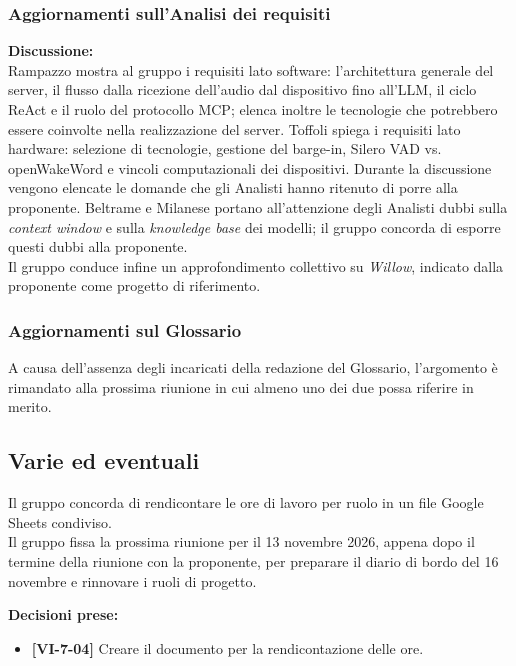 \documentclass[12pt,a4paper]{article}
\newcommand{\tightlist}{\setlength{\itemsep}{1pt}\setlength{\parskip}{0pt}}
\begin{document}
\subsubsection{Aggiornamenti sull'Analisi dei requisiti}
\textbf{Discussione:} \\
Rampazzo mostra al gruppo i requisiti lato software: l'architettura generale del server, il flusso dalla ricezione dell'audio dal dispositivo fino all'LLM, il ciclo ReAct e il ruolo del protocollo MCP; elenca inoltre le tecnologie che potrebbero essere coinvolte nella realizzazione del server.
Toffoli spiega i requisiti lato hardware: selezione di tecnologie, gestione del barge-in, Silero VAD vs. openWakeWord e vincoli computazionali dei dispositivi. Durante la discussione vengono elencate le domande che gli Analisti hanno ritenuto di porre alla proponente. Beltrame e Milanese portano all'attenzione degli Analisti dubbi sulla \textit{context window} e sulla \textit{knowledge base} dei modelli; il gruppo concorda di esporre questi dubbi alla proponente. \\
Il gruppo conduce infine un approfondimento collettivo su \textit{Willow}, indicato dalla proponente come progetto di riferimento.

\subsubsection{Aggiornamenti sul Glossario}
A causa dell'assenza degli incaricati della redazione del Glossario, l'argomento è rimandato alla prossima riunione in cui almeno uno dei due possa riferire in merito.

\newpage

\hypertarget{varie-ed-eventuali}{%
\subsection{Varie ed eventuali}}
Il gruppo concorda di rendicontare le ore di lavoro per ruolo in un file Google Sheets condiviso. \\
Il gruppo fissa la prossima riunione per il 13 novembre 2026, appena dopo il termine della riunione con la proponente, per preparare il diario di bordo del 16 novembre e rinnovare i ruoli di progetto.

\textbf{Decisioni prese:}
\begin{itemize}
\tightlist
\item[$\checkmark$] \textbf{[VI-7-04]} Creare il documento per la rendicontazione delle ore.
\end{itemize}
\end{document}
